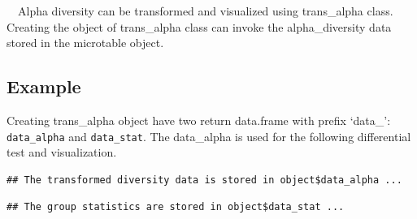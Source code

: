 \documentclass[
]{book}
\newenvironment{Shaded}{\begin{snugshade}}{\end{snugshade}}
\newcommand{\AttributeTok}[1]{\textcolor[rgb]{0.77,0.63,0.00}{#1}}
\newcommand{\CommentTok}[1]{\textcolor[rgb]{0.56,0.35,0.01}{\textit{#1}}}
\newcommand{\FunctionTok}[1]{\textcolor[rgb]{0.00,0.00,0.00}{#1}}
\newcommand{\NormalTok}[1]{#1}
\newcommand{\OtherTok}[1]{\textcolor[rgb]{0.56,0.35,0.01}{#1}}
\newcommand{\SpecialCharTok}[1]{\textcolor[rgb]{0.00,0.00,0.00}{#1}}
\newcommand{\StringTok}[1]{\textcolor[rgb]{0.31,0.60,0.02}{#1}}
\begin{document}
　Alpha diversity can be transformed and visualized using trans\_alpha class.
Creating the object of trans\_alpha class can invoke the alpha\_diversity data stored in the microtable object.

\hypertarget{example-2}{%
\subsection{Example}\label{example-2}}

Creating trans\_alpha object have two return data.frame with prefix `data\_': \texttt{data\_alpha} and \texttt{data\_stat}.
The data\_alpha is used for the following differential test and visualization.

\begin{Shaded}
\end{Shaded}

\begin{verbatim}
## The transformed diversity data is stored in object$data_alpha ...
\end{verbatim}

\begin{verbatim}
## The group statistics are stored in object$data_stat ...
\end{verbatim}
\end{document}
